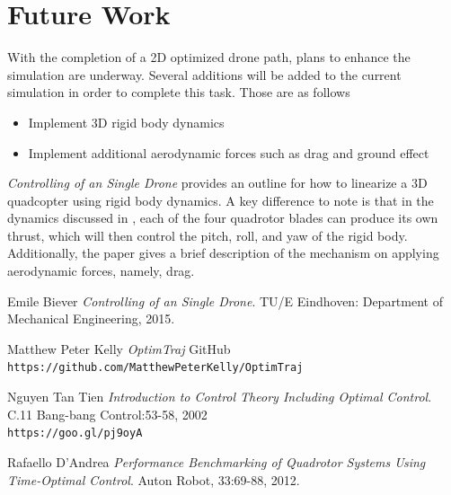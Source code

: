 \documentclass[12pt]{article}
\begin{document}
\clearpage
\section{Future Work}
With the completion of a 2D optimized drone path, plans to enhance the simulation are underway. Several additions will be added to the current simulation in order to complete this task. Those are as follows 
\newline
\begin{itemize}
  \item Implement 3D rigid body dynamics
  \item Implement additional aerodynamic forces such as drag and ground effect
\end{itemize}
\textit{Controlling of an Single Drone}\cite{Controlling of an Single Drone} provides an outline for how to linearize a 3D quadcopter using rigid body dynamics. A key difference to note is that in the dynamics discussed in \cite{Controlling of an Single Drone}, each of the four quadrotor blades can produce its own thrust, which will then control the pitch, roll, and yaw of the rigid body. Additionally, the paper gives a brief description of the mechanism on applying aerodynamic forces, namely, drag.


\clearpage



\begin{thebibliography}{9}


Emile Biever
\textit{Controlling of an Single Drone}.
TU/E Eindhoven: Department of Mechanical Engineering, 2015.



Matthew Peter Kelly
\textit{OptimTraj}
GitHub
\\\texttt{https://github.com/MatthewPeterKelly/OptimTraj}


Nguyen Tan Tien
\textit{Introduction to Control Theory Including Optimal Control}.
C.11 Bang-bang Control:53-58, 2002
\\\texttt{https://goo.gl/pj9oyA}



Rafaello D'Andrea
\textit{Performance Benchmarking of Quadrotor Systems Using Time-Optimal Control}.
Auton Robot, 33:69-88, 2012.















\end{thebibliography}


\end{document}
